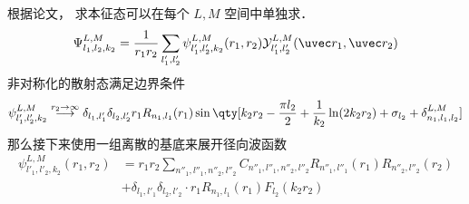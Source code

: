 
根据论文， 求本征态可以在每个 $L,M$ 空间中单独求．
\begin{equation}
\Psi_{l_1,l_2,k_2}^{L,M} = \frac{1}{r_1 r_2}\sum_{l'_1, l'_2}  \psi_{l'_1, l'_2, k_2}^{L, M}(r_1, r_2)\mathcal{Y}_{l'_1, l'_2}^{L, M}(\uvec r_1, \uvec r_2)
\end{equation}
非对称化的散射态满足边界条件
\begin{equation}
\psi_{l'_1,l'_2,k_2}^{L, M} \overset{r_2\to\infty}{\longrightarrow} \delta_{l_1,l'_1}\delta_{l_2,l'_2} r_1 R_{n_1,l_1}(r_1)
\sin\qty[k_2 r_2 - \frac{\pi l_2}{2} +\frac{1}{k_2}\ln(2k_2 r_2) + \sigma_{l_2} + \delta_{n_1,l_1,l_2}^{L,M}]
\end{equation}
那么接下来使用一组离散的基底来展开径向波函数
\begin{equation}
\begin{aligned}
\psi_{l'_1, l'_2,k_2}^{L, M}(r_1, r_2) &= r_1r_2\sum_{n''_1,l''_1,n''_2,l''_2} C_{n''_1,l''_1,n''_2,l''_2} R_{n''_1,l''_1}(r_1) R_{n''_2,l''_2}(r_2)\\
& +\delta_{l_1,l'_1}\delta_{l_2,l'_2} \cdot r_1 R_{n_1,l_1}(r_1) F_{l_2}(k_2 r_2)
\end{aligned}
\end{equation}

